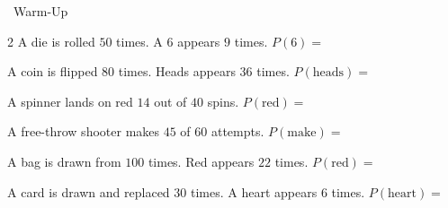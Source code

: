 \begin{practiceBox}[funGreen]{\faSun~Warm-Up}


\begin{multicols}{2}
\prob A die is rolled $50$ times. A $6$ appears $9$ times. $P(6) =$ \answerBlank[2cm]

\prob A coin is flipped $80$ times. Heads appears $36$ times. $P(\text{heads}) =$ \answerBlank[2cm]

\prob A spinner lands on red $14$ out of $40$ spins. $P(\text{red}) =$ \answerBlank[2cm]

\prob A free-throw shooter makes $45$ of $60$ attempts. $P(\text{make}) =$ \answerBlank[2cm]

\prob A bag is drawn from $100$ times. Red appears $22$ times. $P(\text{red}) =$ \answerBlank[2cm]

\prob A card is drawn and replaced $30$ times. A heart appears $6$ times. $P(\text{heart}) =$ \answerBlank[2cm]
\end{multicols}
\end{practiceBox}

